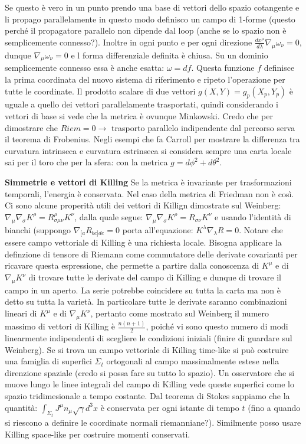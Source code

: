 \documentclass[10pt,a4paper]{article}
\begin{document}
Se questo è vero in un punto prendo una base di vettori dello spazio cotangente e li propago parallelamente in questo modo definisco un campo di 1-forme (questo perché il propagatore parallelo non dipende dal loop (anche se lo spazio non è semplicemente connesso?). Inoltre in ogni punto e per ogni direzione $\frac{dx^{\mu}}{d\lambda} \nabla_{\mu} \omega_{\nu} = 0$, dunque $\nabla_{\mu} \omega_{\nu} = 0$ e l forma differenziale definita è chiusa. Su un dominio semplicemente connesso essa è anche esatta: $\omega = df$. Questa funzione $f$ definisce la prima coordinata del nuovo sistema di riferimento e ripeto l'operazione per tutte le coordinate. Il prodotto scalare di due vettori $g(X, Y) = g_p (X_p, Y_p)$ è uguale a quello dei vettori parallelamente trasportati, quindi considerando i vettori di base si vede che la metrica è ovunque Minkowski. Credo che per dimostrare che $Riem = 0 \rightarrow $ trasporto parallelo indipendente dal percorso serva il teorema di Frobenius. 
Negli esempi che fa Carroll per mostrare la differenza tra curvatura intrinseca e curvatura estrinseca si considera sempre una carta locale sai per il toro che per la sfera: con la metrica $g = d\phi^2+d\theta^2$. 

\textbf{Simmetrie e vettori di Killing}
 Se la metrica è invariante per trasformazioni temporali, l'energia è conservata. Nel caso della metrica di Friedman non è così. Ci sono alcune properità utili dei vettori di Killign dimostrate sul Weinberg: $\nabla_{\mu} \nabla_{\sigma} K^{\rho} = R^{\rho}_{\sigma \mu \nu} K^{\nu}$, dalla quale segue: $\nabla_{\mu} \nabla_{\sigma} K^{\rho} =R_{\sigma \nu} K^{\nu}$ e usando l'identità di bianchi (suppongo $\nabla_{[a}R_{bc]de} = 0$ porta all'equazione: $K^{\lambda} \nabla_{\lambda} R = 0$. Notare che essere campo vettoriale di Killing è una richiesta locale.
Bisogna applicare la definzione di tensore di Riemann come commutatore delle derivate covarianti per ricavare questa espressione, che permette a partire dalla conoscenza di $K^{\mu}$ e di $\nabla_{\mu} K^{\nu}$ di trovare tutte le derivate del campo di Killing e dunque di trovare il campo in un aperto. La serie potrebbe coincidere su tutta la carta ma non è detto su tutta la varietà. In particolare tutte le derivate saranno combinazioni lineari di $K^{\mu}$ e di $\nabla_{\mu} K^{\nu}$, pertanto come mostrato sul Weinberg il numero massimo di vettori di Killing è $\frac{n(n+1)}{2}$, poiché vi sono questo numero di modi linearmente indipendenti di scegliere le condizioni iniziali (finire di guardare sul Weinberg).
Se si trova un campo vettoriale di Killing time-like si può costruire una famiglia di superfici $\Sigma_t$ ortogonali al campo massimalmente estese nella direnzione spaziale (credo si possa fare su tutto lo spazio). Un osservatore che si muove lungo le linee integrali del campo di Killing vede queste superfici come lo spazio tridimesionale a tempo costante. Dal teorema di Stokes sappiamo che la quantità: $\int_{\Sigma_t} J^{\mu} n_{\mu} \sqrt{\gamma} d^3x$ è conservata per ogni istante di tempo $t$ (fino a quando si riescono a definire le coordinate normali riemanniane?). Similmente posso usare Killing space-like per costruire momenti conservati.\\
\end{document}
